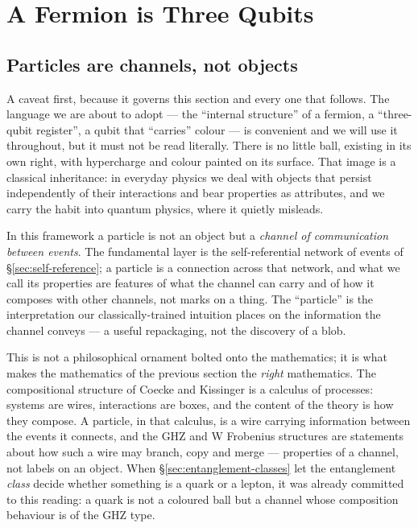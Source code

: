 \section{A Fermion is Three Qubits}
\label{sec:register}

\subsection{Particles are channels, not objects}
\label{sec:register-preface}

A caveat first, because it governs this section and every one that follows. The language we are
about to adopt --- the ``internal structure'' of a fermion, a ``three-qubit register'', a qubit
that ``carries'' colour --- is convenient and we will use it throughout, but it must not be read
literally. There is no little ball, existing in its own right, with hypercharge and colour painted
on its surface. That image is a classical inheritance: in everyday physics we deal with objects
that persist independently of their interactions and bear properties as attributes, and we carry
the habit into quantum physics, where it quietly misleads.

In this framework a particle is not an object but a \emph{channel of communication between events}.
The fundamental layer is the self-referential network of events of \S\ref{sec:self-reference}; a
particle is a connection across that network, and what we call its properties are features of what
the channel can carry and of how it composes with other channels, not marks on a thing. The
``particle'' is the interpretation our classically-trained intuition places on the information the
channel conveys --- a useful repackaging, not the discovery of a blob.

This is not a philosophical ornament bolted onto the mathematics; it is what makes the mathematics
of the previous section the \emph{right} mathematics. The compositional structure of Coecke and
Kissinger \autocite{coeckekissinger2010compositional,CoeckeKissinger2017} is a calculus of processes: systems are
wires, interactions are boxes, and the content of the theory is how they compose. A particle, in
that calculus, is a wire carrying information between the events it connects, and the GHZ and W
Frobenius structures are statements about how such a wire may branch, copy and merge --- properties
of a channel, not labels on an object. When \S\ref{sec:entanglement-classes} let the entanglement
\emph{class} decide whether something is a quark or a lepton, it was already committed to this
reading: a quark is not a coloured ball but a channel whose composition behaviour is of the GHZ
type.

